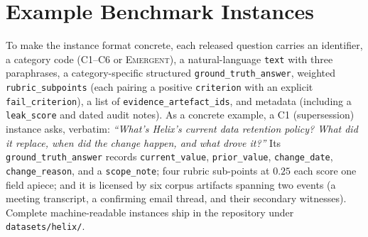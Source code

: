 \documentclass[11pt]{article}
\begin{document}
\section{Example Benchmark Instances}
\label{app:examples}
To make the instance format concrete, each released question carries an
identifier, a category code (C1--C6 or \textsc{Emergent}), a natural-language
\texttt{text} with three paraphrases, a category-specific structured
\texttt{ground\_truth\_answer}, weighted \texttt{rubric\_subpoints} (each pairing
a positive \texttt{criterion} with an explicit \texttt{fail\_criterion}), a list
of \texttt{evidence\_artefact\_ids}, and metadata (including a \texttt{leak\_score}
and dated audit notes). As a concrete example, a C1 (supersession) instance asks,
verbatim: \emph{``What's Helix's current data retention policy? What did it
replace, when did the change happen, and what drove it?''} Its
\texttt{ground\_truth\_answer} records \texttt{current\_value},
\texttt{prior\_value}, \texttt{change\_date}, \texttt{change\_reason}, and a
\texttt{scope\_note}; four rubric sub-points at $0.25$ each score one field
apiece; and it is licensed by six corpus artifacts spanning two events (a meeting
transcript, a confirming email thread, and their secondary witnesses). Complete
machine-readable instances ship in the repository under \texttt{datasets/helix/}.
\end{document}
